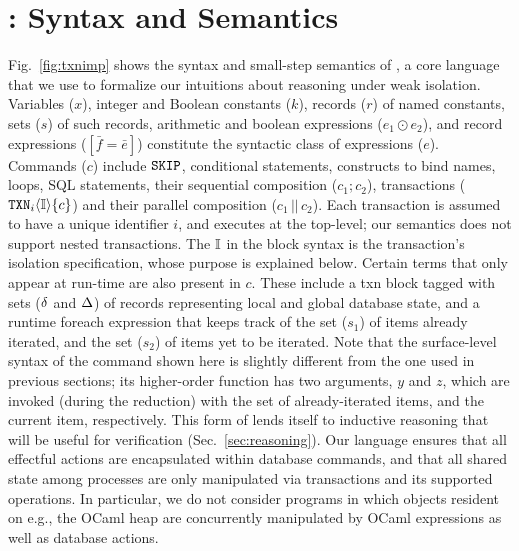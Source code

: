 \section{\txnimp: Syntax and Semantics}
\label{sec:opsem}

\label{sec:syntax}



Fig.~\ref{fig:txnimp} shows the syntax and small-step semantics of
\txnimp, a core language that we use to formalize our intuitions about
reasoning under weak isolation. Variables ($x$), integer and Boolean
constants ($k$), records ($r$) of named constants, sets ($s$) of such
records, arithmetic and boolean expressions ($e_1 \odot e_2$), and
record expressions ($[\bar{f}=\bar{e}]$) constitute the syntactic
class of expressions ($e$). Commands ($c$) include ${\tt SKIP}$,
conditional statements,  constructs to bind names, 
loops, SQL statements, their sequential composition ($c_1;c_2$),
transactions (${\tt TXN}_{i}\langle \mathbb{I} \rangle\{c\}$) and their parallel composition
($c_1\,||\,c_2$). Each transaction is assumed to have a unique
identifier $i$, and executes at the top-level; our semantics does not
support nested transactions. The $\mathbb{I}$ in the  block syntax is
the transaction's isolation specification, whose purpose is explained
below.  Certain terms that only appear at run-time are also present in
$c$.  These include a {\sf txn} block tagged with sets ($\delta$ and
$\Delta$) of records representing local and global database state, and a
runtime {\sf foreach} expression that keeps track of the set ($s_1$)
of items already iterated, and the set ($s_2$) of items yet to be
iterated. Note that the surface-level syntax of the 
command shown here is slightly different from the one used in previous
sections; its higher-order function has two arguments, $y$ and $z$,
which are invoked (during the reduction) with the set of
already-iterated items, and the current item, respectively. This form
of  lends itself to inductive reasoning that will be useful
for verification (Sec.~\ref{sec:reasoning}).  Our language ensures
that all effectful actions are encapsulated within database commands,
and that all shared state among processes are only manipulated via
transactions and its supported operations.  In particular, we do not
consider programs in which objects resident on e.g., the OCaml heap
are concurrently manipulated by OCaml expressions as well as database
actions.



